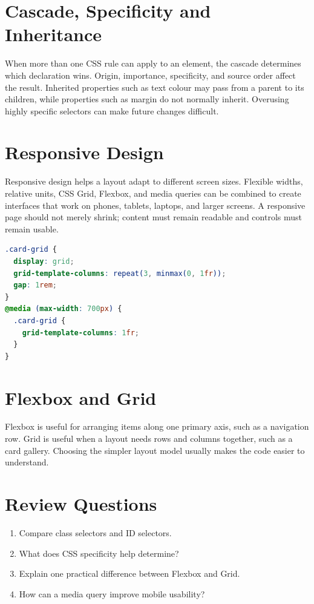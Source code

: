 \documentclass[11pt,openany,oneside]{book}
\begin{document}
\section{Cascade, Specificity and Inheritance}
When more than one CSS rule can apply to an element, the cascade determines which declaration wins. Origin, importance, specificity, and source order affect the result. Inherited properties such as text colour may pass from a parent to its children, while properties such as margin do not normally inherit. Overusing highly specific selectors can make future changes difficult.

\section{Responsive Design}
Responsive design helps a layout adapt to different screen sizes. Flexible widths, relative units, CSS Grid, Flexbox, and media queries can be combined to create interfaces that work on phones, tablets, laptops, and larger screens. A responsive page should not merely shrink; content must remain readable and controls must remain usable.

\begin{lstlisting}[style=webcode,language=CSS]
.card-grid {
  display: grid;
  grid-template-columns: repeat(3, minmax(0, 1fr));
  gap: 1rem;
}
@media (max-width: 700px) {
  .card-grid {
    grid-template-columns: 1fr;
  }
}
\end{lstlisting}

\section{Flexbox and Grid}
Flexbox is useful for arranging items along one primary axis, such as a navigation row. Grid is useful when a layout needs rows and columns together, such as a card gallery. Choosing the simpler layout model usually makes the code easier to understand.

\section*{Review Questions}
\begin{enumerate}
\item Compare class selectors and ID selectors.
\item What does CSS specificity help determine?
\item Explain one practical difference between Flexbox and Grid.
\item How can a media query improve mobile usability?
\end{enumerate}
\end{document}
